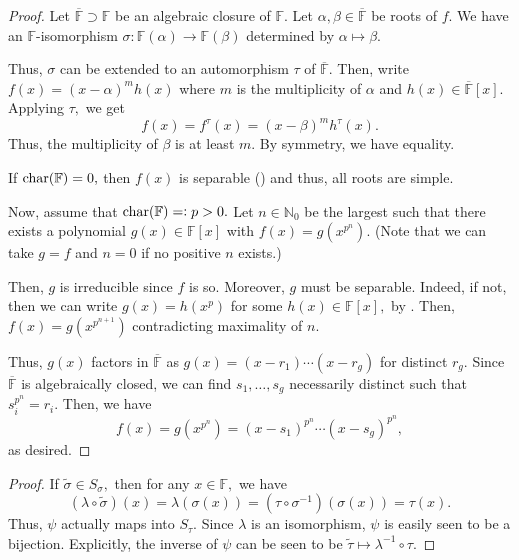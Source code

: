 \samemultirredpoly*\label{prop:samemultirredpoly2}
\begin{flushright}\hyperref[prop:samemultirredpoly]{\upsym}\end{flushright}
\begin{proof}
    Let $\overline{\mathbb{F}} \supset \mathbb{F}$ be an algebraic closure of $\mathbb{F}.$ Let $\alpha, \beta \in \overline{\mathbb{F}}$ be roots of $f.$ We have an $\mathbb{F}$-isomorphism $\sigma : \mathbb{F}(\alpha) \to \mathbb{F}(\beta)$ determined by $\alpha \mapsto \beta.$ 

    Thus, $\sigma$ can be extended to an automorphism $\tau$ of $\overline{\mathbb{F}}.$ Then, write $f(x) = (x - \alpha)^mh(x)$ where $m$ is the multiplicity of $\alpha$ and $h(x) \in \overline{\mathbb{F}}[x].$ Applying $\tau,$ we get
    \begin{equation*} 
        f(x) = f^\tau(x) = (x - \beta)^m h^\tau(x).
    \end{equation*}
    Thus, the multiplicity of $\beta$ is at least $m.$ By symmetry, we have equality.

    If $\operatorname{char}(\mathbb{F}) = 0,$ then $f(x)$ is separable () and thus, all roots are simple.

    Now, assume that $\operatorname{char}(\mathbb{F}) =\vcentcolon p > 0.$ Let $n \in \mathbb{N}_0$ be the largest such that there exists a polynomial $g(x) \in \mathbb{F}[x]$ with $f(x) = g(x^{p^n}).$ (Note that we can take $g = f$ and $n = 0$ if no positive $n$ exists.)

    Then, $g$ is irreducible since $f$ is so. Moreover, $g$ must be separable. Indeed, if not, then we can write $g(x) = h(x^p)$ for some $h(x) \in \mathbb{F}[x],$ by . Then, $f(x) = g(x^{p^{n + 1}})$ contradicting maximality of $n.$

    Thus, $g(x)$ factors in $\overline{\mathbb{F}}$ as $g(x) = (x - r_1) \cdots (x - r_g)$ for distinct $r_g.$ Since $\overline{\mathbb{F}}$ is algebraically closed, we can find $s_1, \ldots, s_g$ necessarily distinct such that $s_i^{p^n} = r_i.$ Then, we have
    \begin{equation*} 
        f(x) = g(x^{p^n}) = (x - s_1)^{p^n} \cdots (x - s_g)^{p^n},
    \end{equation*}
    as desired.
\end{proof}

\separabledegreedef*\label{thm:separabledegreedef2}
\begin{flushright}\hyperref[thm:separabledegreedef]{\upsym}\end{flushright}
\begin{proof}
    If $\widetilde{\sigma} \in S_\sigma,$ then for any $x \in \mathbb{F},$ we have
    \begin{equation*} 
        (\lambda \circ \widetilde{\sigma})(x) = \lambda(\sigma(x)) = (\tau \circ \sigma^{-1})(\sigma(x)) = \tau(x).
    \end{equation*}
    Thus, $\psi$ actually maps into $S_\tau.$ Since $\lambda$ is an isomorphism, $\psi$ is easily seen to be a bijection. Explicitly, the inverse of $\psi$ can be seen to be $\widetilde{\tau} \mapsto \lambda^{-1} \circ \tau.$
\end{proof}

